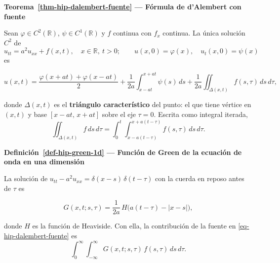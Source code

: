 \documentclass[
  spanish,
  a4paper,
]{scrbook}
\theoremstyle{definition}
\theoremstyle{plain}
\theoremstyle{definition}
\theoremstyle{plain}
\theoremstyle{definition}
\theoremstyle{remark}
\begin{document}
\begin{tcolorbox}[enhanced jigsaw, arc=.35mm, bottomrule=.15mm, breakable, colback=white, colframe=quarto-callout-note-color-frame, left=2mm, leftrule=.75mm, opacityback=0, rightrule=.15mm, toprule=.15mm]
\begin{minipage}[t]{5.5mm}
\textcolor{quarto-callout-note-color}{\faInfo}
\end{minipage}%
\begin{minipage}[t]{\textwidth - 5.5mm}

\vspace{-3mm}\textbf{Teorema~\ref{thm-hip-dalembert-fuente} --- Fórmula de d'Alembert con
fuente}\vspace{3mm}

Sean \(\varphi\in C^2(\mathbb R)\), \(\psi\in C^1(\mathbb R)\) y \(f\)
continua con \(f_x\) continua. La única solución \(C^2\) de
\[u_{tt} = a^2u_{xx} + f(x,t),\quad x\in\mathbb R,\ t>0;\qquad u(x,0)=\varphi(x),\quad u_t(x,0)=\psi(x)\]
es

\[
u(x,t) = \frac{\varphi(x+at)+\varphi(x-at)}{2} + \frac{1}{2a}\int_{x-at}^{x+at}\psi(s)\,ds
+ \frac{1}{2a}\iint_{\Delta(x,t)} f(s,\tau)\,ds\,d\tau ,
\]

donde \(\Delta(x,t)\) es el \textbf{triángulo característico} del punto:
el que tiene vértice en \((x,t)\) y base \([x-at,\,x+at]\) sobre el eje
\(\tau=0\). Escrita como integral iterada, \[
\iint_{\Delta(x,t)} f\,ds\,d\tau = \int_0^t\int_{x-a(t-\tau)}^{x+a(t-\tau)} f(s,\tau)\,ds\,d\tau .
\]

\end{minipage}%
\end{tcolorbox}

\begin{tcolorbox}[enhanced jigsaw, arc=.35mm, bottomrule=.15mm, breakable, colback=white, colframe=quarto-callout-note-color-frame, left=2mm, leftrule=.75mm, opacityback=0, rightrule=.15mm, toprule=.15mm]
\begin{minipage}[t]{5.5mm}
\textcolor{quarto-callout-note-color}{\faInfo}
\end{minipage}%
\begin{minipage}[t]{\textwidth - 5.5mm}

\vspace{-3mm}\textbf{Definición~\ref{def-hip-green-1d} --- Función de Green de la ecuación de
onda en una dimensión}\vspace{3mm}

La solución de \(u_{tt} - a^2u_{xx} = \delta(x-s)\,\delta(t-\tau)\) con
la cuerda en reposo antes de \(\tau\) es

\[
G(x,t;s,\tau) = \frac{1}{2a}\,H\!\big(a(t-\tau) - |x-s|\big),
\]

donde \(H\) es la función de Heaviside. Con ella, la contribución de la
fuente en \ref{eq-hip-dalembert-fuente} es \[
\int_0^\infty\!\!\int_{-\infty}^{\infty} G(x,t;s,\tau)\,f(s,\tau)\,ds\,d\tau .
\]

\end{minipage}%
\end{tcolorbox}
\end{document}
